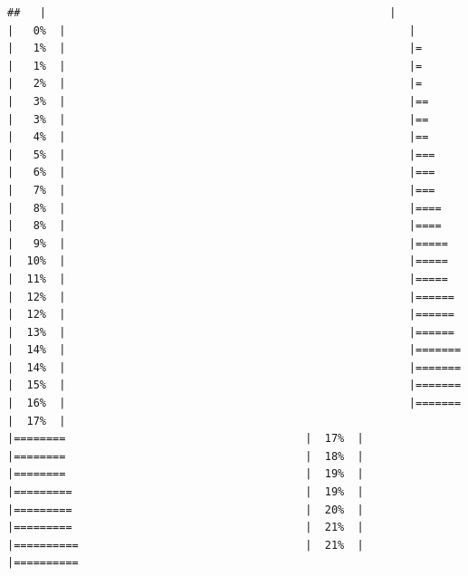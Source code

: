 \documentclass[
  krantz2]{krantz}
\begin{document}
\begin{verbatim}
##   |                                                     |                                             |   0%  |                                                     |                                             |   1%  |                                                     |=                                            |   1%  |                                                     |=                                            |   2%  |                                                     |=                                            |   3%  |                                                     |==                                           |   3%  |                                                     |==                                           |   4%  |                                                     |==                                           |   5%  |                                                     |===                                          |   6%  |                                                     |===                                          |   7%  |                                                     |===                                          |   8%  |                                                     |====                                         |   8%  |                                                     |====                                         |   9%  |                                                     |=====                                        |  10%  |                                                     |=====                                        |  11%  |                                                     |=====                                        |  12%  |                                                     |======                                       |  12%  |                                                     |======                                       |  13%  |                                                     |======                                       |  14%  |                                                     |=======                                      |  14%  |                                                     |=======                                      |  15%  |                                                     |=======                                      |  16%  |                                                     |=======                                      |  17%  |                                                     |========                                     |  17%  |                                                     |========                                     |  18%  |                                                     |========                                     |  19%  |                                                     |=========                                    |  19%  |                                                     |=========                                    |  20%  |                                                     |=========                                    |  21%  |                                                     |==========                                   |  21%  |                                                     |==========         
\end{verbatim}
\end{document}
